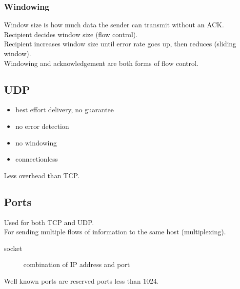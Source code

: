 \subsubsection{Windowing}

Window size is how much data the sender can transmit without an ACK.\\

Recipient decides window size (flow control).\\

Recipient increases window size until error rate goes up, then reduces (sliding
window).\\

Windowing and acknowledgement are both forms of flow control.

\subsection{UDP}

\begin{itemize}

\item best effort delivery, no guarantee
\item no error detection
\item no windowing
\item connectionless

\end{itemize}

Less overhead than TCP.

\subsection{Ports}

Used for both TCP and UDP.\\

For sending multiple flows of information to the same host (multiplexing).

\begin{description}

\item[socket]
combination of IP address and port

\end{description}

Well known ports are reserved ports less than 1024.\\

